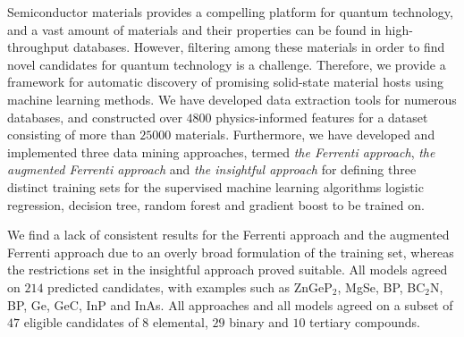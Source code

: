 Semiconductor materials provides a compelling platform for quantum technology, and a vast amount of materials and their properties can be found in high-throughput databases.
However, filtering among these materials in order to find novel candidates for quantum technology is a challenge. Therefore, we provide a framework for automatic discovery of promising solid-state material hosts using machine learning methods.
We have developed data extraction tools for numerous databases, and constructed over $4800$ physics-informed features for a dataset consisting of more than $25000$ materials.
Furthermore, we have developed and implemented three data mining approaches, termed \textit{the Ferrenti approach}, \textit{the augmented Ferrenti approach} and \textit{the insightful approach} for defining three distinct training sets for the supervised machine learning algorithms logistic regression, decision tree, random forest and gradient boost to be trained on.

We find a lack of consistent results for the Ferrenti approach and the augmented Ferrenti approach due to an overly broad formulation of the training set, whereas the restrictions set in the insightful approach proved suitable. All models agreed on $214$ predicted candidates, with examples such as ZnGeP$_2$, MgSe, BP, BC$_2$N, BP, Ge, GeC, InP and InAs. All approaches and all models agreed on a subset of $47$ eligible candidates of $8$ elemental, $29$ binary and $10$ tertiary compounds.





